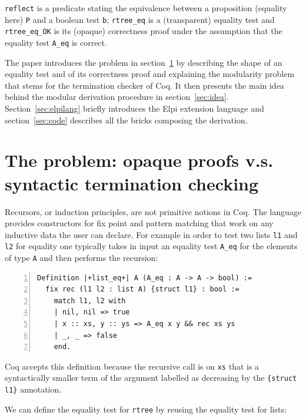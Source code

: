 \documentclass[a4paper,UKenglish,cleveref, autoref]{lipics-v2019}
\begin{document}
\noindent
\lstinline+reflect+
is a predicate stating the equivalence between a proposition (equality here)
\lstinline+P+ and a boolean test \lstinline+b+;
\lstinline+rtree_eq+ is a (transparent) equality test and
\lstinline+rtree_eq_OK+ is its (opaque) correctness proof
under the assumption that the equality test \lstinline+A_eq+ is correct.

The paper introduces the problem in
section~\ref{sec:problem} by describing the shape of an equality test
and of its correctness proof and explaining the modularity problem
that stems for the termination checker of Coq. It then
presents the main idea behind the
modular derivation procedure in section~\ref{sec:idea}.
Section~\ref{sec:elpilang} briefly introduces the Elpi extension language
and section~\ref{sec:code} describes all the bricks composing the
derivation.


\section{The problem: opaque proofs v.s. syntactic termination checking} %
\label{sec:problem}

Recursors, or induction principles, are not primitive notions in Coq.
The language provides constructors for fix point and pattern matching
that work on any inductive data the user can declare.
For example in order to test two lists \lstinline+l1+ and \lstinline+l2+ for
equality one typically takes in input an equality test \lstinline+A_eq+
for the elements of type \lstinline+A+ and then performs the
recursion:

\begin{lstlisting}[numbers=left]
Definition |+list_eq+| A (A_eq : A -> A -> bool) :=
  fix rec (l1 l2 : list A) {struct l1} : bool :=
    match l1, l2 with
    | nil, nil => true
    | x :: xs, y :: ys => A_eq x y && rec xs ys
    | _, _ => false
    end.
\end{lstlisting}

\noindent
Coq accepts this definition because
the recursive call is on \lstinline+xs+ that is a syntactically
smaller term of the argument
labelled as decreasing by the \lstinline+{struct l1}+
annotation.

We can define the equality test for \lstinline+rtree+
by reusing the equality test for lists:
\end{document}
